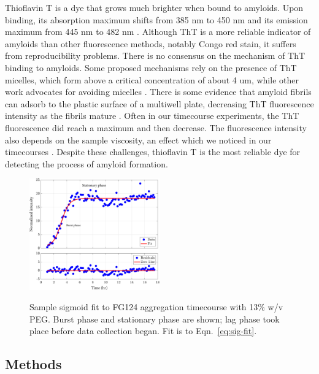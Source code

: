 Thioflavin T is a dye that grows much brighter when bound to amyloids.  Upon binding, its absorption maximum shifts from 385 nm to 450 nm and its emission maximum from 445 nm to 482 nm \cite{picken12}.  Although ThT is a more reliable indicator of amyloids than other fluorescence methods, notably Congo red stain, it suffers from reproducibility problems.  There is no consensus on the mechanism of ThT binding to amyloids.  Some proposed mechanisms rely on the presence of ThT micelles, which form above a critical concentration of about 4 um, while other work advocates for avoiding micelles \cite{khurana05, groenning09}.  There is some evidence that amyloid fibrils can adsorb to the plastic surface of a multiwell plate, decreasing ThT fluorescence intensity as the fibrils mature \cite{murray13}.  Often in our timecourse experiments, the ThT fluorescence did reach a maximum and then decrease.  The fluorescence intensity also depends on the sample viscosity, an effect which we noticed in our timecourses \cite{sulatskaya10}.  Despite these challenges, thioflavin T is the most reliable dye for detecting the process of amyloid formation.

\begin{figure}
\caption[Sample sigmoid fit to FG124 aggregation timecourse.]{Sample sigmoid fit to FG124 aggregation timecourse with 13\% w/v PEG.  Burst phase and stationary phase are shown; lag phase took place before data collection began.  Fit is to Eqn.~\ref{eq:sig-fit}.\\}
\centering
\includegraphics[width=0.5\textwidth]{figs/ch05/sample-sigmoid}
\label{fig:sigmoid-fit}
\end{figure}

\subsection{Methods}

